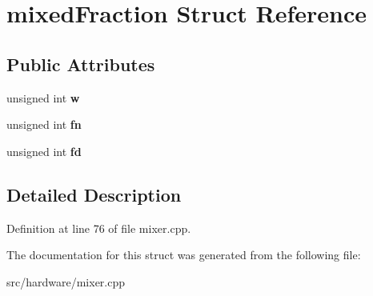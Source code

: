 \hypertarget{structmixedFraction}{\section{mixed\-Fraction Struct Reference}
\label{structmixedFraction}
}
\subsection*{Public Attributes}
\begin{DoxyCompactItemize}
\item 
\hypertarget{structmixedFraction_a484432dffd5bcac1bc2d4e69414bd978}{unsigned int {\bfseries w}}\label{structmixedFraction_a484432dffd5bcac1bc2d4e69414bd978}

\item 
\hypertarget{structmixedFraction_a85d8f9ad58da3ceaf9770e9adf9e7209}{unsigned int {\bfseries fn}}\label{structmixedFraction_a85d8f9ad58da3ceaf9770e9adf9e7209}

\item 
\hypertarget{structmixedFraction_a0e436d4cd7ec6f822b1ba73921cd922f}{unsigned int {\bfseries fd}}\label{structmixedFraction_a0e436d4cd7ec6f822b1ba73921cd922f}

\end{DoxyCompactItemize}


\subsection{Detailed Description}


Definition at line 76 of file mixer.\-cpp.



The documentation for this struct was generated from the following file\-:\begin{DoxyCompactItemize}
\item 
src/hardware/mixer.\-cpp\end{DoxyCompactItemize}
